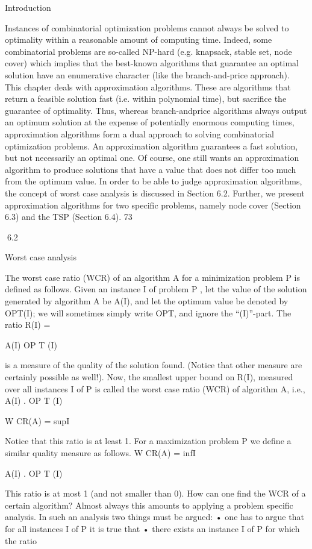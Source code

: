 \documentclass[titlepage]{book}
\theoremstyle{plain}
\theoremstyle{definition}
\theoremstyle{remark}
\begin{document}
Introduction

Instances of combinatorial optimization problems cannot always be solved to optimality within a reasonable amount of computing time. Indeed, some combinatorial problems are so-called NP-hard (e.g.
knapsack, stable set, node cover) which implies that the best-known algorithms that guarantee an optimal solution have an enumerative character (like the branch-and-price approach).
This chapter deals with approximation algorithms. These are algorithms that return a feasible solution
fast (i.e. within polynomial time), but sacrifice the guarantee of optimality. Thus, whereas branch-andprice algorithms always output an optimum solution at the expense of potentially enormous computing
times, approximation algorithms form a dual approach to solving combinatorial optimization problems.
An approximation algorithm guarantees a fast solution, but not necessarily an optimal one. Of course,
one still wants an approximation algorithm to produce solutions that have a value that does not differ
too much from the optimum value. In order to be able to judge approximation algorithms, the concept
of worst case analysis is discussed in Section 6.2. Further, we present approximation algorithms for two
specific problems, namely node cover (Section 6.3) and the TSP (Section 6.4).
73

6.2

Worst case analysis

The worst case ratio (WCR) of an algorithm A for a minimization problem P is defined as follows. Given
an instance I of problem P , let the value of the solution generated by algorithm A be A(I), and let the
optimum value be denoted by OPT(I); we will sometimes simply write OPT, and ignore the “(I)”-part.
The ratio
R(I) =

A(I)
OP T (I)

is a measure of the quality of the solution found. (Notice that other measure are certainly possible as
well!). Now, the smallest upper bound on R(I), measured over all instances I of P is called the worst
case ratio (WCR) of algorithm A, i.e.,
A(I)
.
OP T (I)

W CR(A) = supI

Notice that this ratio is at least 1. For a maximization problem P we define a similar quality measure as
follows.
W CR(A) = infI

A(I)
.
OP T (I)

This ratio is at most 1 (and not smaller than 0). How can one find the WCR of a certain algorithm?
Almost always this amounts to applying a problem specific analysis. In such an analysis two things must
be argued:
• one has to argue that for all instances I of P it is true that
• there exists an instance I of P for which the ratio
\end{document}
